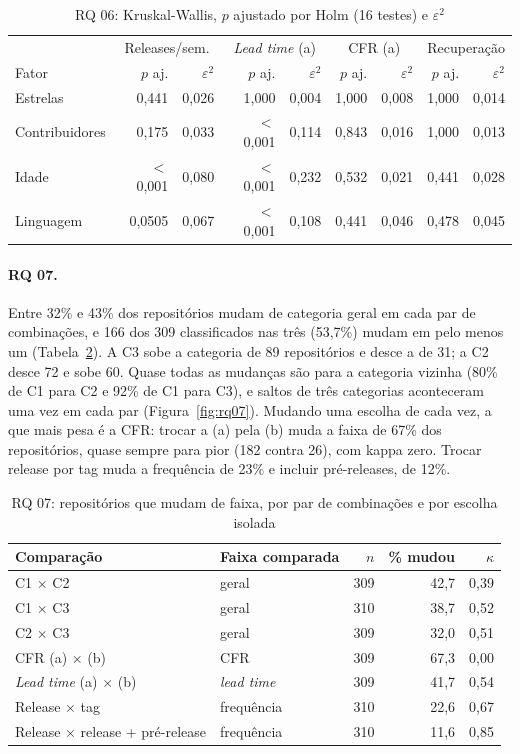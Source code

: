 \documentclass[12pt]{article}
\begin{document}
\begin{table}[ht]
\centering
\caption{RQ 06: Kruskal-Wallis, $p$ ajustado por Holm (16 testes) e $\varepsilon^2$}
\label{tab:rq06}
\small
\begin{tabular}{lrrrrrrrr}
\hline
& \multicolumn{2}{c}{Releases/sem.} & \multicolumn{2}{c}{\textit{Lead time} (a)} &
\multicolumn{2}{c}{CFR (a)} & \multicolumn{2}{c}{Recuperação} \\
Fator & $p$ aj. & $\varepsilon^2$ & $p$ aj. & $\varepsilon^2$ & $p$ aj. & $\varepsilon^2$ & $p$ aj. &
$\varepsilon^2$ \\
\hline
Estrelas & 0,441 & 0,026 & 1,000 & 0,004 & 1,000 & 0,008 & 1,000 & 0,014 \\
Contribuidores & 0,175 & 0,033 & $<$0,001 & 0,114 & 0,843 & 0,016 & 1,000 & 0,013 \\
Idade & $<$0,001 & 0,080 & $<$0,001 & 0,232 & 0,532 & 0,021 & 0,441 & 0,028 \\
Linguagem & 0,0505 & 0,067 & $<$0,001 & 0,108 & 0,441 & 0,046 & 0,478 & 0,045 \\
\hline
\end{tabular}
\end{table}

\paragraph{RQ 07.} Entre 32\% e 43\% dos repositórios mudam de categoria geral em cada par de
combinações, e 166 dos 309 classificados nas três (53,7\%) mudam em pelo menos um
(Tabela~\ref{tab:rq07}). A C3 sobe a categoria de 89 repositórios e desce a de 31; a C2 desce 72 e
sobe 60. Quase todas as mudanças são para a categoria vizinha (80\% de C1 para C2 e 92\% de C1 para
C3), e saltos de três categorias aconteceram uma vez em cada par (Figura~\ref{fig:rq07}). Mudando uma escolha de cada vez, a
que mais pesa é a CFR: trocar a (a) pela (b) muda a faixa de 67\% dos repositórios, quase sempre para
pior (182 contra 26), com kappa zero. Trocar release por tag muda a frequência de 23\% e incluir
pré-releases, de 12\%.

\begin{table}[ht]
\centering
\caption{RQ 07: repositórios que mudam de faixa, por par de combinações e por escolha isolada}
\label{tab:rq07}
\small
\begin{tabular}{llrrr}
\hline
Comparação & Faixa comparada & $n$ & \% mudou & $\kappa$ \\
\hline
C1 × C2 & geral & 309 & 42,7 & 0,39 \\
C1 × C3 & geral & 310 & 38,7 & 0,52 \\
C2 × C3 & geral & 309 & 32,0 & 0,51 \\
\hline
CFR (a) × (b) & CFR & 309 & 67,3 & 0,00 \\
\textit{Lead time} (a) × (b) & \textit{lead time} & 309 & 41,7 & 0,54 \\
Release × tag & frequência & 310 & 22,6 & 0,67 \\
Release × release + pré-release & frequência & 310 & 11,6 & 0,85 \\
\hline
\end{tabular}
\end{table}
\end{document}
